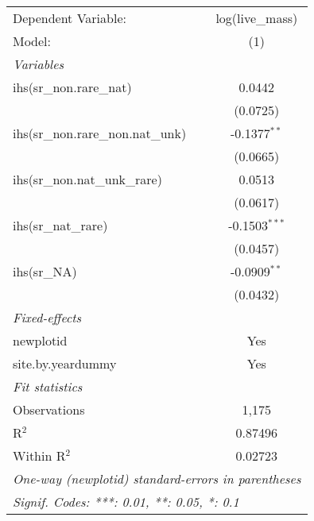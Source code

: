 \begin{tabular}{lc}
\tabularnewline\midrule\midrule
Dependent Variable:&log(live\_mass)\\
Model:&(1)\\
\midrule \emph{Variables}&  \\
ihs(sr\_non.rare\_nat)&0.0442\\
  &(0.0725)\\
ihs(sr\_non.rare\_non.nat\_unk)&-0.1377$^{**}$\\
  &(0.0665)\\
ihs(sr\_non.nat\_unk\_rare)&0.0513\\
  &(0.0617)\\
ihs(sr\_nat\_rare)&-0.1503$^{***}$\\
  &(0.0457)\\
ihs(sr\_NA)&-0.0909$^{**}$\\
  &(0.0432)\\
\midrule \emph{Fixed-effects}&  \\
newplotid & Yes\\
site.by.yeardummy & Yes\\
\midrule \emph{Fit statistics}&  \\
Observations & 1,175\\
R$^2$ & 0.87496\\
Within R$^2$ & 0.02723\\
\midrule\midrule\multicolumn{2}{l}{\emph{One-way (newplotid) standard-errors in parentheses}}\\
\multicolumn{2}{l}{\emph{Signif. Codes: ***: 0.01, **: 0.05, *: 0.1}}\\
\end{tabular}


